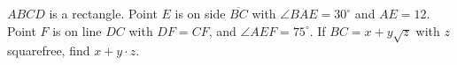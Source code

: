 $ABCD$ is a rectangle. Point $E$ is on side $\overline{BC}$ with $\angle BAE=30^\circ$ and $AE=12$. Point $F$ is on line $DC$ with $DF=CF$, and $\angle AEF=75^\circ$. If $BC=x+y\sqrt z$ with $z$ squarefree, find $x+y\cdot z$.
